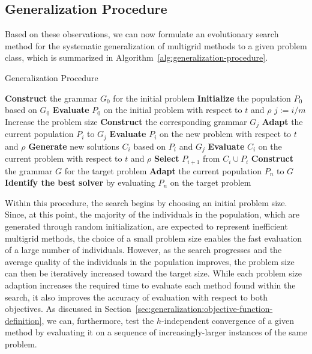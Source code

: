 \subsection{Generalization Procedure}
\label{sec:generalization-procedure}
Based on these observations, we can now formulate an evolutionary search method for the systematic generalization of multigrid methods to a given problem class, which is summarized in Algorithm~\ref{alg:generalization-procedure}.
\begin{algorithm}
	\caption{Generalization Procedure}
	\label{alg:generalization-procedure}
	\begin{algorithmic}[1] %
		\State \textbf{Construct} the grammar $G_0$ for the initial problem
		\State \textbf{Initialize} the population $P_0$ based on $G_0$
		\State \textbf{Evaluate} $P_0$ on the initial problem with respect to $t$ and $\rho$
		\State $j := i / m$ 
		\State Increase the problem size
		\State \textbf{Construct} the corresponding grammar $G_j$
		\State  \textbf{Adapt} the current population $P_i$ to $G_j$
		\State \textbf{Evaluate} $P_i$ on the new problem with respect to $t$ and $\rho$
		\EndIf
		\State \textbf{Generate} new solutions $C_i$ based on $P_i$ and $G_j$
		\State \textbf{Evaluate} $C_i$ on the current problem with respect to $t$ and $\rho$
		\State \textbf{Select} $P_{i+1}$ from $C_i \cup P_i$
		\EndFor
		\State \textbf{Construct} the grammar $G$ for the target problem
		\State  \textbf{Adapt} the current population $P_n$ to $G$
		\State \textbf{Identify the best solver} by evaluating $P_{n}$ on the target problem
	\end{algorithmic}
\end{algorithm}
Within this procedure, the search begins by choosing an initial problem size.
Since, at this point, the majority of the individuals in the population, which are generated through random initialization, are expected to represent inefficient multigrid methods, the choice of a small problem size enables the fast evaluation of a large number of individuals.
However, as the search progresses and the average quality of the individuals in the population improves, the problem size can then be iteratively increased toward the target size.
While each problem size adaption increases the required time to evaluate each method found within the search, it also improves the accuracy of evaluation with respect to both objectives.
As discussed in Section~\ref{sec:generalization:objective-function-definition}, we can, furthermore, test the $h$-independent convergence of a given method by evaluating it on a sequence of increasingly-larger instances of the same problem.
